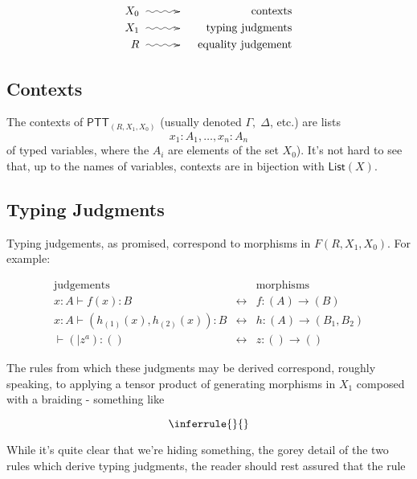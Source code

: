 \documentclass[pra,floatfix,
amsmath,superscriptaddress, 12pt]{article}
\theoremstyle{definition}
\begin{document}
    \begin{eqnarray*}
      X_0
        & \xymatrix@C=3em{{}\ar@{~>}[r]&{}}
            & \mathrm{contexts} \\
      X_1 & \xymatrix@C=3em{{}\ar@{~>}[r]&{}} & \mathrm{typing \ judgments} \\
      R   & \xymatrix@C=3em{{}\ar@{~>}[r]&{}} & \mathrm{equality \ judgement}
    \end{eqnarray*}

\subsection{Contexts}

The contexts of $\mathsf{PTT}_{(R,X_1,X_0)}$ (usually denoted $\Gamma,\;\Delta$, etc.) are lists
    \[
        x_{1}:A_{1},\dots,x_{n}:A_{n}
    \]
of typed variables, where the $A_i$ are elements of the set $X_{0}$). It's not hard to see that, up to the names of variables, contexts are in bijection with $\mathsf{List}(X)$.

\subsection{Typing Judgments}

Typing judgements, as promised, correspond to morphisms in $F(R,X_1,X_0)$. For example:

\begin{eqnarray*}
    \mathrm{judgements}
        &
          &
          \mathrm{morphisms} \\
    x:A\vdash f\left(x\right):B
        &
        \longleftrightarrow
            & f:(A) \longrightarrow (B) \\
    x:A\vdash\left(h_{\left(1\right)}\left(x\right),h_{\left(2\right)}\left(x\right)\right):B
        &
        \longleftrightarrow
            &
            h:(A)\longrightarrow\left(B_{1},B_{2}\right) \\
    \vdash\left(|z^{a}\right):\left(\right)
        &
        \longleftrightarrow
            &
            z:() \longrightarrow ()
\end{eqnarray*}

The rules from which these judgments may be derived correspond, roughly speaking, to applying a tensor product of generating morphisms in $X_1$ composed with a braiding - something like

\[
    \inferrule{}{}
\]

While it's quite clear that we're hiding something, the gorey detail of the two rules which derive typing judgments, the reader should rest assured that the rule
\end{document}
